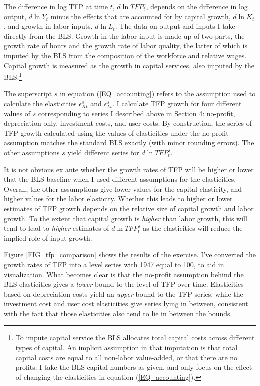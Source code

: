 \documentclass[11pt]{article}
\begin{document}
The difference in log TFP at time $t$, $d \ln TFP^s_t$, depends on the difference in log output, $d \ln Y_t$ minus the effects that are accounted for by capital growth, $d \ln K_t$, and growth in labor inputs, $d \ln L_t$. The data on output and inputs I take directly from the BLS. Growth in the labor input is made up of two parts, the growth rate of hours and the growth rate of labor quality, the latter of which is imputed by the BLS from the composition of the workforce and relative wages. Capital growth is measured as the growth in capital services, also imputed by the BLS.\footnote{To impute capital service the BLS allocates total capital costs across different types of capital. An implicit assumption in that imputation is that total capital costs are equal to all non-labor value-added, or that there are no profits. I take the BLS capital numbers as given, and only focus on the effect of changing the elasticities in equation (\ref{EQ_accounting}).}

The superscript $s$ in equation (\ref{EQ_accounting}) refers to the assumption used to calculate the elasticities $\epsilon^s_{Kt}$ and $\epsilon^s_{Lt}$. I calculate TFP growth for four different values of $s$ corresponding to series I described above in Section 4: no-profit, depreciation only, investment costs, and user costs. By construction, the series of TFP growth calculated using the values of elasticities under the no-profit assumption matches the standard BLS exactly (with minor rounding errors). The other assumptions $s$ yield different series for $d \ln TFP^s_t$.

It is not obvious ex ante whether the growth rates of TFP will be higher or lower that the BLS baseline when I used different assumptions for the elasticities. Overall, the other assumptions give lower values for the capital elasticity, and higher values for the labor elasticity. Whether this leads to higher or lower estimates of TFP growth depends on the relative size of capital growth and labor growth. To the extent that capital growth is \textit{higher} than labor growth, this will tend to lead to \textit{higher} estimates of $d \ln TFP^s_t$ as the elasticities will reduce the implied role of input growth. 

Figure \ref{FIG_tfp_comparison} shows the results of the exercise. I've converted the growth rates of TFP into a level series with 1947 equal to 100, to aid in visualization. What becomes clear is that the no-profit assumption behind the BLS elasticities gives a \textit{lower} bound to the level of TFP over time. Elasticities based on depreciation costs yield an \textit{upper} bound to the TFP series, while the investment cost and user cost elasticities give series lying in between, consistent with the fact that those elasticities also tend to lie in between the bounds. 
\end{document}
